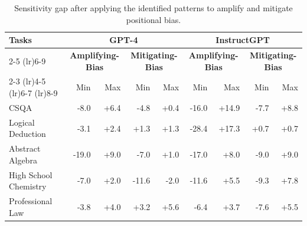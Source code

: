 \documentclass[11pt]{article}
\begin{document}
\begin{table}[t!]
\small
\centering
\begin{tabular}{lrrrrrrrr}
\toprule 
\multirow{2}{*}{\bf Tasks}& \multicolumn{4}{c}{\bf GPT-4}&  \multicolumn{4}{c}{\bf InstructGPT}\\
\cmidrule(lr){2-5}
\cmidrule(lr){6-9}
&\multicolumn{2}{c}{\bf Amplifying-Bias}&  \multicolumn{2}{c}{\bf Mitigating-Bias}&\multicolumn{2}{c}{\bf Amplifying-Bias}&  \multicolumn{2}{c}{\bf Mitigating-Bias}\\
\cmidrule(lr){2-3}
\cmidrule(lr){4-5}
\cmidrule(lr){6-7}
\cmidrule(lr){8-9}
&Min&Max&Min&Max&Min&Max&Min&Max\\
\midrule
CSQA &-8.0& +6.4& -4.8 & +0.4&-16.0&+14.9&-7.7&+8.8\\
Logical Deduction&-3.1&+2.4& +1.3 & +1.3&-28.4&+17.3& +0.7&+0.7\\
Abstract Algebra &-19.0&+9.0&-7.0&+1.0&-17.0&+8.0&-9.0&+9.0\\
High School Chemistry &-7.0& +2.0& -11.6&-2.0&-11.6 & +5.5&-9.3&+7.8\\
Professional Law &-3.8& +4.0& +3.2&+5.6&-6.4& +3.7 &-7.6&+5.5\\
\bottomrule
\end{tabular}
\caption{Sensitivity gap after applying the identified patterns to amplify and mitigate positional bias.}
\label{tab:patt-det}
\end{table}
\end{document}
